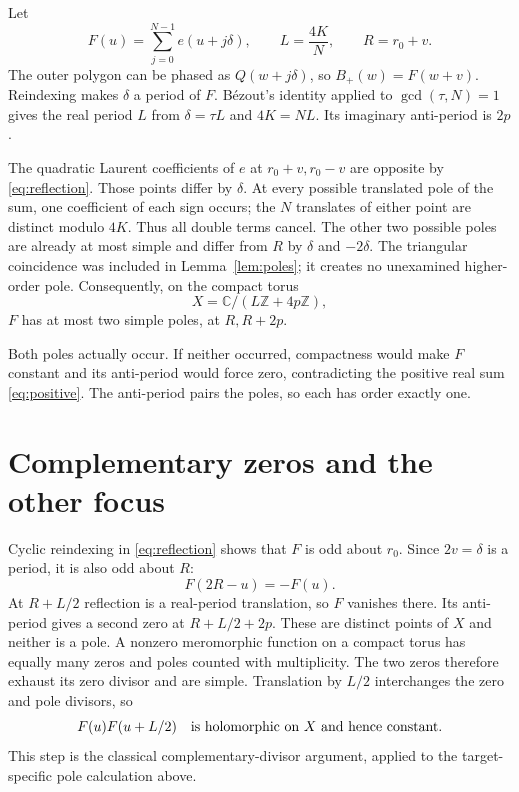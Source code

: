 \documentclass[11pt]{article}
\begin{document}
Let
\begin{equation}\label{eq:F}
 F(u)=\sum_{j=0}^{N-1}e(u+j\delta),\qquad L=\frac{4K}{N},\qquad R=r_0+v.
\end{equation}
The outer polygon can be phased as $Q(w+j\delta)$, so $B_+(w)=F(w+v)$. Reindexing makes $\delta$ a period of $F$. B\'ezout's identity applied to $\gcd(\tau,N)=1$ gives the real period $L$ from $\delta=\tau L$ and $4K=NL$. Its imaginary anti-period is $2p$.

The quadratic Laurent coefficients of $e$ at $r_0+v,r_0-v$ are opposite by \eqref{eq:reflection}. Those points differ by $\delta$. At every possible translated pole of the sum, one coefficient of each sign occurs; the $N$ translates of either point are distinct modulo $4K$. Thus all double terms cancel. The other two possible poles are already at most simple and differ from $R$ by $\delta$ and $-2\delta$. The triangular coincidence was included in Lemma~\ref{lem:poles}; it creates no unexamined higher-order pole. Consequently, on the compact torus
\begin{equation}\label{eq:torus}
 X=\mathbb C/(L\mathbb Z+4p\mathbb Z),
\end{equation}
$F$ has at most two simple poles, at $R,R+2p$.

Both poles actually occur. If neither occurred, compactness would make $F$ constant and its anti-period would force zero, contradicting the positive real sum \eqref{eq:positive}. The anti-period pairs the poles, so each has order exactly one.

\section{Complementary zeros and the other focus}
Cyclic reindexing in \eqref{eq:reflection} shows that $F$ is odd about $r_0$. Since $2v=\delta$ is a period, it is also odd about $R$:
\[
 F(2R-u)=-F(u).
\]
At $R+L/2$ reflection is a real-period translation, so $F$ vanishes there. Its anti-period gives a second zero at $R+L/2+2p$. These are distinct points of $X$ and neither is a pole. A nonzero meromorphic function on a compact torus has equally many zeros and poles counted with multiplicity. The two zeros therefore exhaust its zero divisor and are simple. Translation by $L/2$ interchanges the zero and pole divisors, so
\begin{equation}\label{eq:constant}
 F(u)F(u+L/2)\quad\hbox{is holomorphic on }X\hbox{ and hence constant}.
\end{equation}
This step is the classical complementary-divisor argument, applied to the target-specific pole calculation above.
\end{document}
